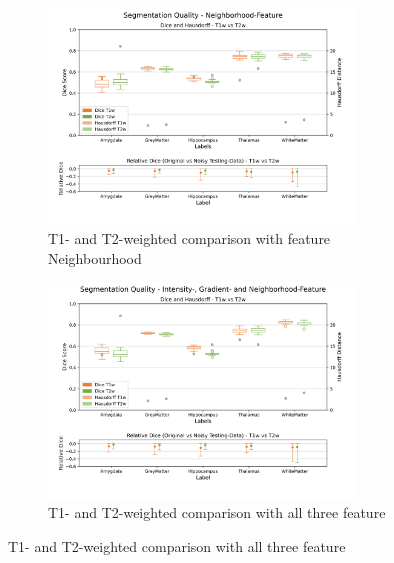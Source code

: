 \documentclass[conference]{IEEEtran}
\begin{document}
\begin{appendices}
\begin{figure}
    \begin{subfigure}
      \centering
      \includegraphics[width=0.9\textwidth, trim={0 15mm 0 10mm}, clip]{images/03_T1W_C_NH_and_07_T2W_C_NH.png}
      \caption{T1- and T2-weighted comparison with feature Neighbourhood}
    \end{subfigure}
    \hspace{100mm}
    \begin{subfigure}
      \centering
      \includegraphics[width=0.9\textwidth, trim={0 15mm 0 10mm}, clip]{images/04_T1W_C_I_G_NH_and_08_T2W_C_I_G_NH.png}
      \caption{T1- and T2-weighted comparison with all three feature}
    \end{subfigure}
    \label{fig:secondTwo}
\end{figure}


\end{appendices}
\end{document}
